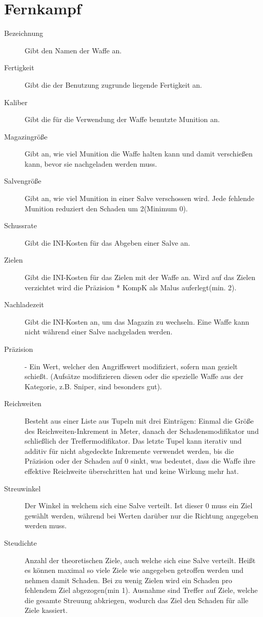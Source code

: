 \documentclass[a4paper,12pt,oneside]{book}
\begin{document}
\section{Fernkampf}
\begin{description}
\item[Bezeichnung] Gibt den Namen der Waffe an.
\item[Fertigkeit]Gibt die der Benutzung zugrunde liegende Fertigkeit an.
\item[Kaliber] Gibt die für die Verwendung der Waffe benutzte Munition an.
\item[Magazingröße] Gibt an, wie viel Munition die Waffe halten kann und damit verschießen kann, bevor sie nachgeladen werden muss.
\item[Salvengröße] Gibt an, wie viel Munition in einer Salve verschossen wird. Jede fehlende Munition reduziert den Schaden um 2(Minimum 0).
\item[Schussrate] Gibt die INI-Kosten für das Abgeben einer Salve an.
\item[Zielen] Gibt die INI-Kosten für das Zielen mit der Waffe an. Wird auf das Zielen verzichtet wird die Präzision * KompK als Malus auferlegt(min. 2).
\item[Nachladezeit] Gibt die INI-Kosten an, um das Magazin zu wechseln. Eine Waffe kann nicht während einer Salve nachgeladen werden.
\item[Präzision] - Ein Wert, welcher den Angriffswert modifiziert, sofern man gezielt schießt. (Aufsätze modifizieren diesen oder die spezielle Waffe aus der Kategorie, z.B. Sniper, sind besonders gut).
\item[Reichweiten] Besteht aus einer Liste aus Tupeln mit drei Einträgen: Einmal die Größe des Reichweiten-Inkrement in Meter, danach der Schadensmodifikator und schließlich der Treffermodifikator. Das letzte Tupel kann iterativ und additiv für nicht abgedeckte Inkremente verwendet werden, bis die Präzision oder der Schaden auf 0 sinkt, was bedeutet, dass die Waffe ihre effektive Reichweite überschritten hat und keine Wirkung mehr hat. 
\item[Streuwinkel] Der Winkel in welchem sich eine Salve verteilt. Ist dieser 0 muss ein Ziel gewählt werden, während bei Werten darüber nur die Richtung angegeben werden muss.
\item[Steudichte] Anzahl der theoretischen Ziele, auch welche sich eine Salve verteilt. Heißt es können maximal so viele Ziele wie angegeben getroffen werden und nehmen damit Schaden. Bei zu wenig Zielen wird ein Schaden pro fehlendem Ziel abgezogen(min 1). Ausnahme sind Treffer auf Ziele, welche die gesamte Streuung abkriegen, wodurch das Ziel den Schaden für alle Ziele kassiert.
\end{description}
\end{document}
